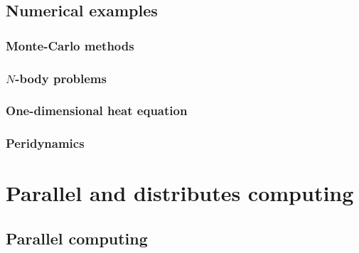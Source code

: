 \documentclass[11pt,fleqn]{book} %
\begin{document}
\chapter{Numerical examples}

\section{Monte-Carlo methods}

\section{$N$-body problems}

\section{One-dimensional heat equation}

\section{Peridynamics}

\part{Parallel and distributes computing}

\chapter{Parallel computing}
\end{document}
